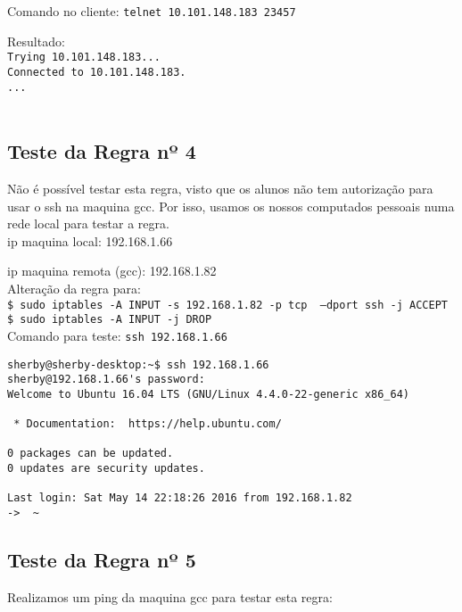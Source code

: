 \documentclass[12pt, a4paper, twoside]{report} %
\begin{document}
\noindent Comando no cliente: \texttt{telnet 10.101.148.183 23457}

\noindent Resultado: \\

\noindent \texttt{Trying 10.101.148.183...} \\
\noindent \texttt{Connected to 10.101.148.183.} \\
\noindent \texttt{...} \\
\
\clearpage

\subsection{Teste da Regra nº 4}

\noindent Não é possível testar esta regra, visto que os alunos não tem autorização para usar o ssh na maquina gcc. Por isso, 
usamos os nossos computados pessoais numa rede local para testar a regra. \\

\noindent ip maquina local: 192.168.1.66

\noindent ip maquina remota (gcc): 192.168.1.82 \\

\noindent Alteração da regra para: \\
\texttt{\$ sudo iptables -A INPUT -s 192.168.1.82 -p tcp \
 --dport ssh -j ACCEPT} \\
\texttt{\$ sudo iptables -A INPUT -j DROP} \\


\noindent Comando para teste: \texttt{ssh 192.168.1.66}

\begin{lstlisting}
sherby@sherby-desktop:~$ ssh 192.168.1.66
sherby@192.168.1.66's password: 
Welcome to Ubuntu 16.04 LTS (GNU/Linux 4.4.0-22-generic x86_64)

 * Documentation:  https://help.ubuntu.com/

0 packages can be updated.
0 updates are security updates.

Last login: Sat May 14 22:18:26 2016 from 192.168.1.82
->  ~ 
\end{lstlisting}

\subsection{Teste da Regra nº 5}

\noindent Realizamos um ping da maquina gcc para testar esta regra: \\
\end{document}

